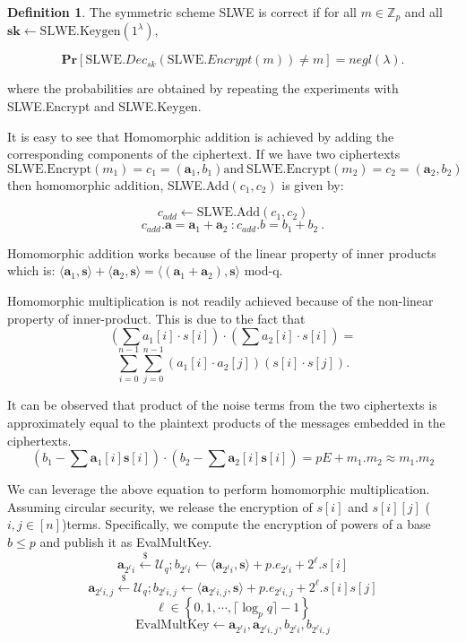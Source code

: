 \documentclass[10pt,journal,compsoc]{IEEEtran}
\theoremstyle{definition}
\newtheorem{definition}{Definition}[section]
\begin{document}
\begin{definition}

The symmetric scheme SLWE is correct if for all $m \in \mathbb{Z}_p$ and all $\textbf{sk} \leftarrow \textrm{SLWE.Keygen}\left( 1^\lambda\right)$,

$$\textbf{Pr}\left[ \textrm{SLWE.}Dec_{sk}\left( \textrm{SLWE.}Encrypt\left( m\right)\right) \neq m \right] = negl\left(\lambda\right).$$

where the probabilities are obtained by repeating the experiments with SLWE.Encrypt and SLWE.Keygen. 

\end{definition}

It is easy to see that Homomorphic addition is achieved by adding the corresponding components of the ciphertext. If we have two ciphertexts $\textrm{SLWE.Encrypt}\left( m_1\right)= c_1 = \left( \textbf{a}_1, b_1 \right) \textrm{and} \ \textrm{SLWE.Encrypt}\left( m_2\right)= c_2 = \left( \textbf{a}_2, b_2 \right)$ then homomorphic addition, SLWE.Add$\left(c_1,c_2\right)$ is given by:

$$c_{add} \leftarrow \textrm{SLWE.Add}(c_1,c_2)$$ $$c_{add}.\textbf{a} = \textbf{a}_1 + \textbf{a}_2\ \colon c_{add}.b = b_1 + b_2\ .$$

Homomorphic addition works because of the linear property of inner products which is:
$\langle \textbf{a}_1,\textbf{s}\rangle + \langle \textbf{a}_2,\textbf{s}\rangle = \langle \left(\textbf{a}_1 + \textbf{a}_2 \right),\textbf{s}\rangle$ mod-q.

Homomorphic multiplication is not readily achieved because of the non-linear property of inner-product. This is due to the fact that $$\left(\sum a_{1}[i]\cdot s[i]\right)\cdot \left(\sum a_2[i]\cdot s[i]\right) = $$ $$\sum_{i=0}^{n-1} \sum_{j=0}^{n-1} \left(a_1[i]\cdot a_2[j]\right)\left(s[i]\cdot s[j]\right).$$

It can be observed that product of the noise terms from the two ciphertexts is approximately equal to the plaintext products of the messages embedded in the ciphertexts.
$$\left(b_1 - \sum \textbf{a}_1[i]\textbf{s}[i] \right)\cdot \left(b_2 - \sum \textbf{a}_2[i]\textbf{s}[i] \right) = pE + m_1.m_2 \approx m_1.m_2$$

We can leverage the above equation to perform homomorphic multiplication. Assuming circular security, we release the encryption of  $s[i]$ and $s[i][j]$ ($i,j \in [n]$)terms. Specifically, we compute the encryption of powers of a base $b \leq p$ and publish it as EvalMultKey.
$$\textbf{a}_{2^{\ell}i} \xleftarrow{\$} \mathcal{U}_q ; b_{2^{\ell}i} \leftarrow \langle \textbf{a}_{2^{\ell}i},\textbf{s}\rangle +p.e_{2^{\ell}i} + 2^{\ell}.s[i]$$ 
$$\textbf{a}_{2^{\ell}i,j} \xleftarrow{\$} \mathcal{U}_q ; b_{2^{\ell}i,j} \leftarrow \langle \textbf{a}_{2^{\ell}i,j},\textbf{s}\rangle +p.e_{2^{\ell}i,j} + 2^{\ell}.s[i]s[j]$$
$$\ell \in \left\{0,1,\cdots,\lceil \log_p{q} \rceil -1 \right\}$$ 
$$\textrm{EvalMultKey} \leftarrow \textbf{a}_{2^{\ell}i},\textbf{a}_{2^{\ell}i,j},b_{2^{\ell}i},b_{2^{\ell}i,j}$$
\end{document}
